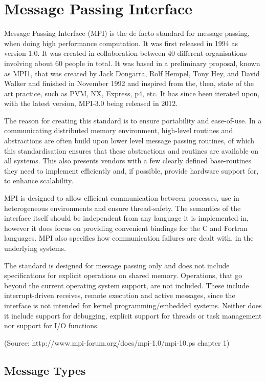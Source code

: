 \section{Message Passing Interface}
Message Passing Interface (MPI) is the de facto standard for message passing, when doing high performance computation. It was first released in 1994 as version 1.0. It was created in collaboration between 40 different organisations involving about 60 people in total. It was based in a preliminary proposal, known as MPI1, that was created by Jack Dongarra, Rolf Hempel, Tony Hey, and David Walker and finished in November 1992 and inspired from the, then, state of the art practice, such as PVM, NX, Express, p4, etc. It has since been iterated upon, with the latest version, MPI-3.0 being released in 2012.

The reason for creating this standard is to ensure portability and ease-of-use. In a communicating distributed memory environment, high-level routines and abstractions are often build upon lower level message passing routines, of which this standardisation ensures that these abstractions and routines are available on all systems. This also presents vendors with a few clearly defined base-routines they need to implement efficiently and, if possible, provide hardware support for, to enhance scalability.

MPI is designed to allow efficient communication between processes, use in heterogeneous environments and ensure thread-safety. The semantics of the interface itself should be independent from any language it is implemented in, however it does focus on providing convenient bindings for the C and Fortran languages. MPI also specifies how communication failures are dealt with, in the underlying systems.

The standard is designed for message passing only and does not include specifications for explicit operations on shared memory. Operations, that go beyond the current operating system support, are not included. These include interrupt-driven receives, remote execution and active messages, since the interface is not intended for kernel programming/embedded systems. Neither does it include support for debugging, explicit support for threads or task management nor support for I/O functions.

(Source: http://www.mpi-forum.org/docs/mpi-1.0/mpi-10.ps chapter 1)

\subsection{Message Types}

